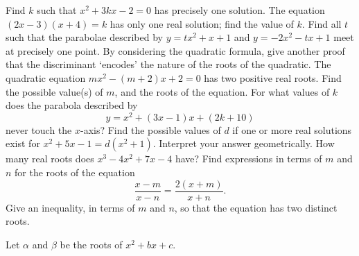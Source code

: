 \begin{questions}
  \question Find $ k $ such that $ x^2 + 3kx - 2 = 0 $ has precisely one solution.
  \question The equation $ (2x - 3)(x + 4) = k $ has only one real solution; find the value of $ k $.
  \question Find all $ t $ such that the parabolae described by $ y = tx^2 + x + 1 $ and $ y = -2x^2 - tx + 1 $ meet at precisely one point.
  \question By considering the quadratic formula, give another proof that the discriminant `encodes' the nature of the roots of the quadratic.
  \question The quadratic equation $ mx^2 - (m + 2)x + 2 = 0 $ has two positive real roots. Find the possible
            value(s) of $ m $, and the roots of the equation.
  \question For what values of $ k $ does the parabola described by
            \begin{displaymath}
              y = x^2 + (3x - 1)x + (2k + 10)
            \end{displaymath}
            never touch the $x$-axis?
  \question Find the possible values of $ d $ if one or more real solutions exist for $ x^2 + 5x - 1 = d(x^2 + 1) $. Interpret
            your answer geometrically.
  \question How many real roots does $ x^3 - 4x^2 + 7x - 4 $ have?
  \question Find expressions in terms of $ m $ and $ n $ for the roots of the equation
            \begin{displaymath}
              \frac{x - m}{x - n} = \frac{2(x + m)}{x + n}.
            \end{displaymath}
            Give an inequality, in terms of $ m $ and $ n $, so that the equation has two distinct roots.
  \question
  \question Let $ \alpha $ and $ \beta $ be the roots of $ x^2 + bx + c $.
    \begin{parts}

\end{parts}
\end{questions}
